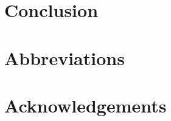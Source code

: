 \documentclass[output=paper]{langsci/langscibook}
\begin{document}
\section{Conclusion}

 
\section*{Abbreviations}
\section*{Acknowledgements}

\printbibliography[heading=subbibliography,notkeyword=this] 
\end{document}
